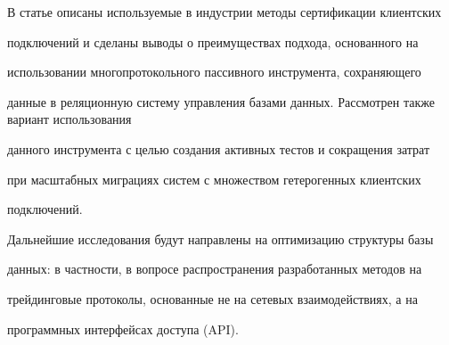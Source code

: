 { %





}





В статье описаны используемые в индустрии методы сертификации клиентских


подключений и сделаны выводы о преимуществах подхода, основанного на


использовании многопротокольного пассивного инструмента, сохраняющего


данные в реляционную систему управления базами данных. Рассмотрен также вариант использования


данного инструмента с целью создания активных тестов и сокращения затрат


при масштабных миграциях систем с множеством гетерогенных клиентских


подключений.





Дальнейшие исследования будут направлены на оптимизацию структуры базы


данных: в частности, в вопросе распространения разработанных методов на


трейдинговые протоколы, основанные не на сетевых взаимодействиях, а на


программных интерфейсах доступа (API).





\vspace*{-6pt}





